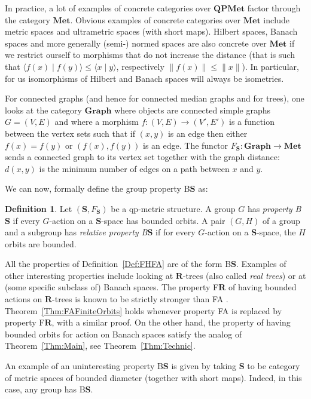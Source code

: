 \documentclass[a4paper]{article}
\theoremstyle{definition}
\newtheorem{defn}[lem]{Definition}
\newcommand*{\BS}{B$\mathbf{S}$}
\begin{document}
In practice, a lot of examples of concrete categories over $\mathbf{QPMet}$ factor through the category $\mathbf{Met}$.
Obvious examples of concrete categories over $\mathbf{Met}$ include metric spaces and ultrametric spaces (with short maps).
Hilbert spaces, Banach spaces and more generally (semi-) normed spaces are also concrete over $\mathbf{Met}$ if we restrict ourself to morphisms that do not increase the distance (that is such that $\langle f(x)\mid f(y)\rangle\leq\langle x\mid y\rangle$, respectively $\|f(x)\|\leq\| x\|$). In particular, for us isomorphisms of Hilbert and Banach spaces will always be isometries.
 
For connected graphs (and hence for connected median graphs and for trees), one looks at the category $\mathbf{Graph}$ where objects are connected simple graphs $G=(V,E)$ and where a morphism $f\colon (V,E)\to(V',E')$ is a function between the vertex sets such that if $(x,y)$ is an edge then either $f(x)=f(y)$ or $(f(x),f(y))$ is an edge.
The functor $F_{\mathbf S}\colon\mathbf{Graph}\to\mathbf{Met}$ sends a connected graph to its vertex set together with the graph distance: $d(x,y)$ is the minimum number of edges on a path between $x$ and $y$.

We can now, formally define the group property \BS{} as:
%
\begin{defn}\label{Def:PropBS}
Let $(\mathbf S,F_{\mathbf S})$ be a qp-metric structure.
A group $G$ has \emph{property \BS} if every $G$-action on a $\mathbf S$-space has bounded orbits.
A pair $(G,H)$ of a group and a subgroup has \emph{relative property \BS} if for every $G$-action on a $\mathbf S$-space, the $H$ orbits are bounded.
\end{defn}
%
%
All the properties of Definition~\ref{Def:FHFA} are of the form \BS.
Examples of other interesting properties include looking at $\mathbf{R}$-trees (also called \emph{real trees}) or at (some specific subclass of) Banach spaces.
The property F$\mathbf{R}$ of having bounded actions on $\mathbf{R}$-trees is known to be strictly stronger than FA \cite{MR3465847}. Theorem~\ref{Thm:FAFiniteOrbits} holds whenever property FA is replaced by property F$\mathbf{R}$, with a similar proof.
On the other hand, the property of having bounded orbits for action on Banach spaces satisfy the analog of Theorem~\ref{Thm:Main}, see Theorem~\ref{Thm:Technic}.

An example of an uninteresting property \BS{} is given by taking $\mathbf{S}$ to be category of metric spaces of bounded diameter (together with short maps). Indeed, in this case, any group has \BS.
\end{document}
